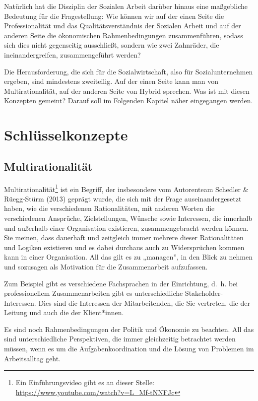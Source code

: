 \documentclass[
  letterpaper,
]{book}
\begin{document}
Natürlich hat die Disziplin der Sozialen Arbeit darüber hinaus eine
maßgebliche Bedeutung für die Fragestellung: Wie können wir auf der
einen Seite die Professionalität und das Qualitätsverständnis der
Sozialen Arbeit und auf der anderen Seite die ökonomischen
Rahmenbedingungen zusammenführen, sodass sich dies nicht gegenseitig
ausschließt, sondern wie zwei Zahnräder, die ineinandergreifen,
zusammengeführt werden?

Die Herausforderung, die sich für die Sozialwirtschaft, also für
Sozialunternehmen ergeben, sind mindestens zweiteilig. Auf der einen
Seite kann man von Multirationalität, auf der anderen Seite von Hybrid
sprechen. Was ist mit diesen Konzepten gemeint? Darauf soll im Folgenden
Kapitel näher eingegangen werden.

\chapter{Schlüsselkonzepte}\label{schluesselkonzepte}

\section{Multirationalität}\label{sozialwirtschat-multirationalitaet}

Multirationalität\footnote{Ein Einführungsvideo gibt es an dieser
  Stelle: \url{https://www.youtube.com/watch?v=L_Mf-tNNFJc}} ist ein
Begriff, der insbesondere vom Autorenteam Schedler \& Rüegg-Stürm (2013)
geprägt wurde, die sich mit der Frage auseinandergesetzt haben, wie die
verschiedenen Rationalitäten, mit anderen Worten die verschiedenen
Ansprüche, Zielstellungen, Wünsche sowie Interessen, die innerhalb und
außerhalb einer Organisation existieren, zusammengebracht werden können.
Sie meinen, dass dauerhaft und zeitgleich immer mehrere dieser
Rationalitäten und Logiken existieren und es dabei durchaus auch zu
Widersprüchen kommen kann in einer Organisation. All das gilt es zu
„managen'', in den Blick zu nehmen und sozusagen als Motivation für die
Zusammenarbeit aufzufassen.

Zum Beispiel gibt es verschiedene Fachsprachen in der Einrichtung, d.~h.
bei professionellem Zusammenarbeiten gibt es unterschiedliche
Stakeholder-Interessen. Dies sind die Interessen der Mitarbeitenden, die
Sie vertreten, die der Leitung und auch die der Klient*innen.

Es sind noch Rahmenbedingungen der Politik und Ökonomie zu beachten. All
das sind unterschiedliche Perspektiven, die immer gleichzeitig
betrachtet werden müssen, wenn es um die Aufgabenkoordination und die
Lösung von Problemen im Arbeitsalltag geht.
\end{document}
